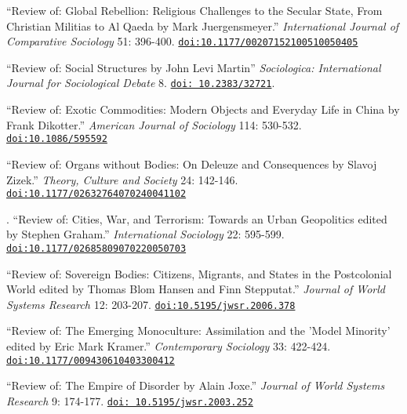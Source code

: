
\ind ``Review of: Global Rebellion: Religious Challenges to the Secular State, From Christian Militias to Al Qaeda by Mark Juergensmeyer.'' {\em International Journal of Comparative Sociology} 51: 396-400. \href{https://doi.org/10.1177/00207152100510050405
}{\nolinkurl{doi:10.1177/00207152100510050405}}

\ind ``Review of: Social Structures by John Levi Martin'' {\em Sociologica: International Journal for Sociological Debate} 8. \href{http://www.rivisteweb.it/doi/10.2383/32721}{\nolinkurl{doi: 10.2383/32721}}.

\ind ``Review of: Exotic Commodities: Modern Objects and Everyday Life in China by Frank Dikotter.'' {\em American Journal of Sociology} 114: 530-532. \href{https://doi.org/10.1086/595592}{\nolinkurl{doi:10.1086/595592}}

\ind ``Review of: Organs without Bodies: On Deleuze and Consequences by Slavoj Zizek.'' {\em Theory, Culture and Society} 24:  142-146.  \href{https://doi.org/10.1177/02632764070240041102}{\nolinkurl{doi:10.1177/02632764070240041102}}

. ``Review of: Cities, War, and Terrorism: Towards an Urban Geopolitics edited by Stephen Graham.'' {\em International Sociology} 22:  595-599.  \href{https://doi.org/10.1177/02685809070220050703}{\nolinkurl{doi:10.1177/02685809070220050703}}

\ind ``Review of: Sovereign Bodies: Citizens, Migrants, and States in the Postcolonial World edited by Thomas Blom Hansen and Finn Stepputat.'' {\em Journal of World Systems Research} 12:  203-207. \href{https://doi.org/10.5195/jwsr.2006.378}{\nolinkurl{doi:10.5195/jwsr.2006.378}}

\ind ``Review of: The Emerging Monoculture: Assimilation and the 'Model Minority' edited by Eric Mark Kramer.''  {\em Contemporary Sociology} 33: 422-424. \href{https://doi.org/10.1177/009430610403300412}{\nolinkurl{doi:10.1177/009430610403300412}}

\ind ``Review of: The Empire of Disorder by Alain Joxe.'' {\em Journal of World Systems Research} 9: 174-177. \href{https://doi.org/10.5195/jwsr.2003.252}{\nolinkurl{doi: 10.5195/jwsr.2003.252}}